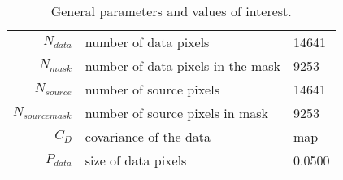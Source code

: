\begin{table*}[!htb]\caption{General parameters and values of interest.}\begin{center}\begin{tabular}{ r l l }\hline $N_{data}$        & number of data pixels             & 14641 \\ 
 $N_{mask}$        & number of data pixels in the mask & 9253 \\ 
 $N_{source}$      & number of source pixels           & 14641 \\ 
 $N_{source mask}$ & number of source pixels in mask   & 9253 \\ 
 $C_D$        & covariance of the data            & map \\ 
 $P_{data}$   & size of data pixels               &     0.0500 \\ 
\hline \hline\end{tabular}\end{center}\label{tab:3}\end{table*}